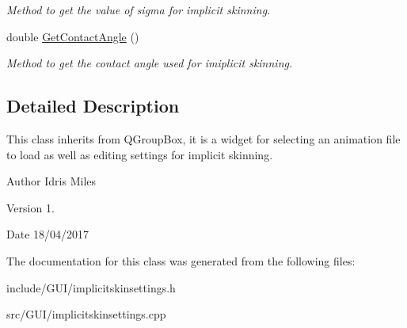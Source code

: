\begin{DoxyCompactItemize}
\begin{DoxyCompactList}\small\item\em Method to get the value of sigma for implicit skinning. \end{DoxyCompactList}\item 
double \hyperlink{classImplicitSkinSettings_a1799bcc571f95a97238a9530a54ed93b}{Get\+Contact\+Angle} ()\hypertarget{classImplicitSkinSettings_a1799bcc571f95a97238a9530a54ed93b}{}\label{classImplicitSkinSettings_a1799bcc571f95a97238a9530a54ed93b}

\begin{DoxyCompactList}\small\item\em Method to get the contact angle used for imiplicit skinning. \end{DoxyCompactList}\end{DoxyCompactItemize}


\subsection{Detailed Description}
This class inherits from Q\+Group\+Box, it is a widget for selecting an animation file to load as well as editing settings for implicit skinning. 

\begin{DoxyAuthor}{Author}
Idris Miles 
\end{DoxyAuthor}
\begin{DoxyVersion}{Version}
1. 
\end{DoxyVersion}
\begin{DoxyDate}{Date}
18/04/2017 
\end{DoxyDate}


The documentation for this class was generated from the following files\+:\begin{DoxyCompactItemize}
\item 
include/\+G\+U\+I/implicitskinsettings.\+h\item 
src/\+G\+U\+I/implicitskinsettings.\+cpp\end{DoxyCompactItemize}
